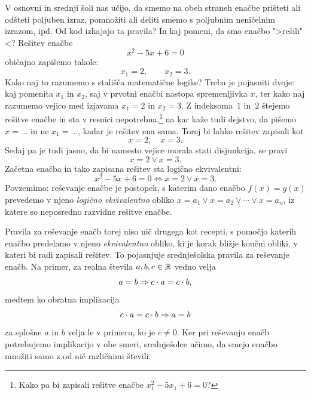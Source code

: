 V osnovni in srednji šoli nas učijo, da smemo na obeh straneh enačbe prišteti ali odšteti poljuben izraz, pomnožiti ali deliti smemo s poljubnim neničelnim izrazom, ipd. Od kod
izhajajo ta pravila? In kaj pomeni, da smo enačbo ">rešili"<? Rešitev enačbe
%
\begin{equation*}
  x^2 - 5 x + 6 = 0
\end{equation*}
%
običajno zapišemo takole:
%
\begin{equation*}
  x_1 = 2, \qquad x_2 = 3.
\end{equation*}
%
Kako naj to razumemo s stališča matematične logike? Treba je
pojasniti dvoje: kaj pomenita $x_1$ in $x_2$, saj v prvotni enačbi
nastopa spremenljivka $x$, ter kako naj razumemo vejico med izjavama
$x_1 = 2$ in $x_2 = 3$. Z indeksoma~$1$ in~$2$ štejemo rešitve enačbe
in sta v resnici nepotrebna,\footnote{Kako pa bi zapisali rešitve
  enačbe $x_1^2 - 5 x_1 + 6 = 0$?} na kar kaže tudi dejstvo, da
pišemo $x = \ldots$ in ne $x_1 = \ldots$, kadar je rešitev ena sama.
Torej bi lahko rešitev zapisali kot
%
\begin{equation*}
  x = 2, \quad x = 3.
\end{equation*}
%
Sedaj pa je tudi jasno, da bi namesto vejice morala stati disjunkcija,
se pravi
%
\begin{equation*}
  x = 2 \lor x = 3.
\end{equation*}
%
Začetna enačba in tako zapisana rešitev sta logično ekvivalentni:
%
\begin{equation*}
  x^2 - 5 x + 6 = 0 \iff
  x = 2 \lor x = 3.
\end{equation*}
%
Povzemimo: reševanje enačbe je postopek, s katerim dano enačbo $f(x) =
g(x)$ prevedemo v njeno \emph{logično ekvivalentno} obliko $x = a_1
\lor x = a_2 \lor \cdots \lor x = a_n$, iz katere so neposredno razvidne
rešitve enačbe.

Pravila za reševanje enačb torej niso nič drugega kot recepti, s
pomočjo katerih enačbo predelamo v njeno \emph{ekvivalentno} obliko, ki
je korak bližje končni obliki, v kateri bi radi zapisali rešitev. To
pojasnjuje srednješolska pravila za reševanje enačb. Na primer, za
realna števila $a, b, c \in \mathbb{R}$ vedno velja
%
\begin{equation*}
  a = b \Rightarrow c \cdot a = c \cdot b,
\end{equation*}
%
medtem ko obratna implikacija
%
\begin{equation*}
  c \cdot a = c \cdot b \Rightarrow a = b
\end{equation*}
%
za splošne $a$ in $b$ velja le v primeru, ko je $c \neq 0$. Ker pri
reševanju enačb potrebujemo implikacijo v obe smeri, srednješolce
učimo, da smejo enačbo množiti samo z od nič različnimi števili.

